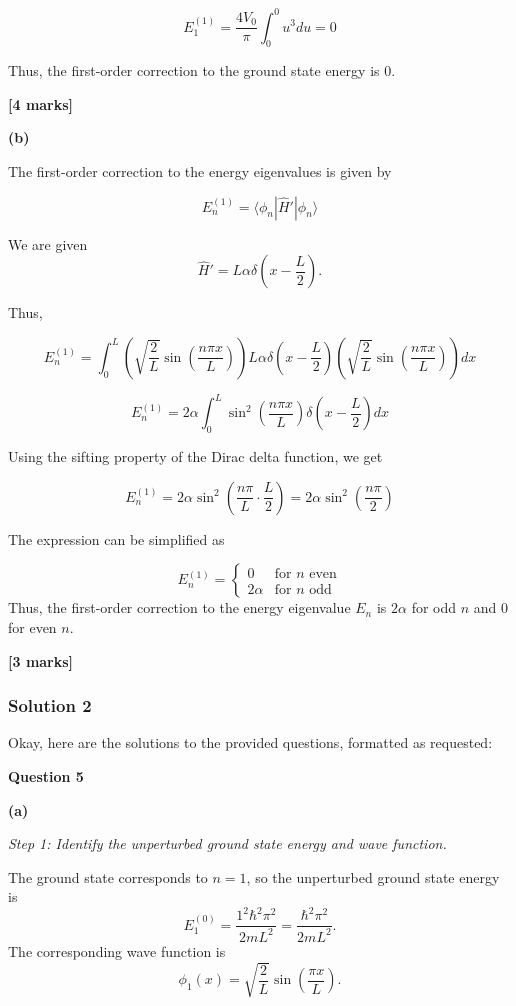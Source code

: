 \documentclass{article}
\begin{document}
\[
E_1^{(1)} = \frac{4V_0}{\pi} \int_0^0 u^3 du = 0
\]

Thus, the first-order correction to the ground state energy is 0.

\textbf{[4 marks]}

\textbf{(b)}

The first-order correction to the energy eigenvalues is given by

\[
E_n^{(1)} = \langle \phi_n | \hat{H}' | \phi_n \rangle
\]

We are given
\[
\hat{H}' = L \alpha \delta\left(x - \frac{L}{2}\right).
\]

Thus,

\[
E_n^{(1)} = \int_0^L \left(\sqrt{\frac{2}{L}} \sin\left(\frac{n\pi x}{L}\right)\right) L \alpha \delta\left(x - \frac{L}{2}\right) \left(\sqrt{\frac{2}{L}} \sin\left(\frac{n\pi x}{L}\right)\right) dx
\]

\[
E_n^{(1)} = 2\alpha \int_0^L \sin^2\left(\frac{n\pi x}{L}\right) \delta\left(x - \frac{L}{2}\right) dx
\]

Using the sifting property of the Dirac delta function, we get

\[
E_n^{(1)} = 2\alpha \sin^2\left(\frac{n\pi}{L} \cdot \frac{L}{2}\right) = 2\alpha \sin^2\left(\frac{n\pi}{2}\right)
\]

The expression can be simplified as

\[
E_n^{(1)} =
\begin{cases}
0 & \text{for } n \text{ even} \\
2\alpha & \text{for } n \text{ odd}
\end{cases}
\]
Thus, the first-order correction to the energy eigenvalue \(E_n\) is \(2\alpha\) for odd \(n\) and \(0\) for even \(n\).

\textbf{[3 marks]}

\subsubsection{Solution 2}
Okay, here are the solutions to the provided questions, formatted as requested:

\textbf{Question 5}

\textbf{(a)}

\textit{Step 1: Identify the unperturbed ground state energy and wave function.}

The ground state corresponds to \(n=1\), so the unperturbed ground state energy is
\[E_1^{(0)} = \frac{1^2 \hbar^2 \pi^2}{2mL^2} = \frac{\hbar^2 \pi^2}{2mL^2}.\]
The corresponding wave function is
\[\phi_1(x) = \sqrt{\frac{2}{L}} \sin\left(\frac{\pi x}{L}\right).\]
\end{document}
